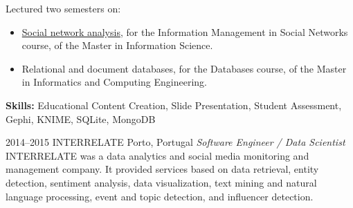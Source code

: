 \documentclass{friggeri-cv}
\begin{document}
\begin{entrylist}
{Lectured two semesters on:\\[-.5em]

\begin{itemize}[leftmargin=*]
  \item \href{http://josedevezas.com/academy/slides/\#girs-20172018}{Social network analysis}, for the Information Management in Social Networks course, of the Master in Information Science.
  \item Relational and document databases, for the Databases course, of the Master in Informatics and Computing Engineering.
\end{itemize}

\vspace{1em}

{\small \textbf{Skills:} Educational Content Creation, Slide Presentation, Student Assessment, Gephi, KNIME, SQLite, MongoDB}\\}
\end{entrylist}
\begin{entrylist}
\entry
{2014--2015}
{INTERRELATE}
{Porto, Portugal}
{\emph{Software Engineer / Data Scientist}\\[-.5em]

INTERRELATE was a data analytics and social media monitoring and management company. It provided services based on data retrieval, entity detection, sentiment analysis, data visualization, text mining and natural language processing, event and topic detection, and influencer detection.\\}
\end{entrylist}
\end{document}
